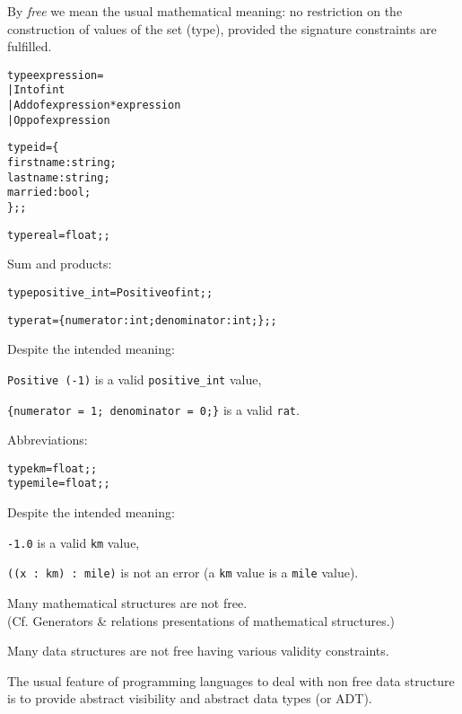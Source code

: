 By {\em free} we mean the usual mathematical meaning: no restriction on the
construction of values of the set (type), provided the signature constraints
are fulfilled.


\begin{alltt}
type expression =
   | Int of int
   | Add of expression * expression
   | Opp of expression

type id = \{
  firstname : string;
  lastname : string;
  married : bool;
\};;

type real = float;;
\end{alltt}


Sum and products:

\begin{alltt}
type positive_int = Positive of int;;

type rat = \{ numerator : int; denominator : int; \};;
\end{alltt}

Despite the intended meaning:
\begin{citemize}
\item \verb"Positive (-1)" is a valid \verb"positive_int" value,
\item \verb"{numerator = 1; denominator = 0;}" is a valid \verb"rat".
\end{citemize}


Abbreviations:

\begin{alltt}
type km = float;;
type mile = float;;
\end{alltt}
Despite the intended meaning:
\begin{citemize}
\item \verb"-1.0" is a valid \verb"km" value,
\item \verb"((x : km) : mile)" is not an error (a \verb"km" value is
a \verb"mile" value).
\end{citemize}


Many mathematical structures are not free.\\
(Cf. Generators \& relations presentations of mathematical structures.)

Many data structures are not free having various validity constraints.

The usual feature of programming languages to deal with non free data
structure is to provide abstract visibility and abstract data types (or ADT).

